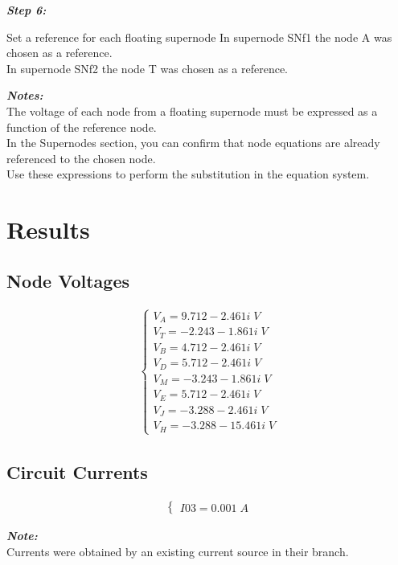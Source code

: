 \documentclass[a4paper]{article}
\begin{document}
\begin{small}\textbf{\textit{Step 6:}}\end{small} Set a reference for each floating supernode
\newline
In supernode SNf1 the node A was chosen as a reference. \\
In supernode SNf2 the node T was chosen as a reference.

\newline
\begin{footnotesize}
\textbf{\textit{Notes:}} \\
The voltage of each node from a floating supernode must be expressed as a function of the reference node. \\
In the Supernodes section, you can confirm that node equations are already referenced to the chosen node. \\
Use these expressions to perform the substitution in the equation system.
\end{footnotesize}


\par

\newpage

\section{Results}

\subsection{Node Voltages}
\begin{gather*}
\begin{cases}V_{A} = 9.712-2.461i\;V \\[0.7em] V_{T} = -2.243-1.861i\;V \\[0.7em] V_{B} = 4.712-2.461i\;V \\[0.7em] V_{D} = 5.712-2.461i\;V \\[0.7em] V_{M} = -3.243-1.861i\;V \\[0.7em] V_{E} = 5.712-2.461i\;V \\[0.7em] V_{J} = -3.288-2.461i\;V \\[0.7em] V_{H} = -3.288-15.461i\;V\end{cases}
\end{gather*}

\subsection{Circuit Currents}
\begin{gather*}
\begin{cases}I03 = 0.001\;A\end{cases}
\end{gather*}
\begin{footnotesize}
\textbf{\textit{Note:}} \\
Currents were obtained by an existing current source in their branch.
\end{footnotesize}
\end{document}
